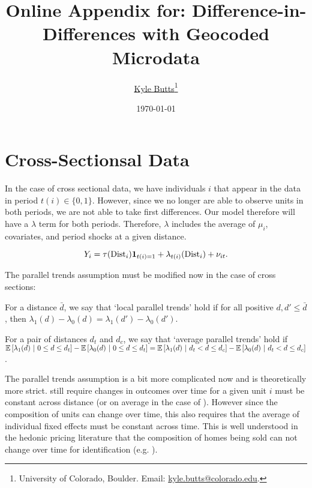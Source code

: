 \documentclass[10pt]{article}
\title{Online Appendix for: Difference-in-Differences with Geocoded Microdata}
\author{\href{https://kylebutts.com/}{Kyle Butts}\thanks{University of Colorado, Boulder. Email: \href{mailto:kyle.butts@colorado.edu}{kyle.butts@colorado.edu}.} %
}
\date{\today}
\newcommand{\dist}{\text{Dist}}
\begin{document}
\maketitle

\section{Cross-Sectionsal Data}

In the case of cross sectional data, we have individuals $i$ that appear in the data in period $t(i) \in \{0,1\}$. However, since we no longer are able to observe units in both periods, we are not able to take first differences. Our model therefore will have a $\lambda$ term for both periods. Therefore, $\lambda$ includes the average of $\mu_i$, covariates, and period shocks at a given distance.

\begin{equation}\label{eq:model_rc}
    Y_{i} = \tau(\dist_i) \one_{t(i) = 1} + \lambda_{t(i)}(\dist_i) + \nu_{it}.  
\end{equation}

The parallel trends assumption must be modified now in the case of cross sections:

\begin{assumption}\label{assum:parallel_rc}
    For a distance $\bar{d}$, we say that `local parallel trends' hold if for all positive $d, d' \leq \bar{d}$, then $\lambda_1(d) - \lambda_0(d) = \lambda_1(d') - \lambda_0(d')$.
\end{assumption}

\begin{assumption}\label{assum:parallel_weak_rc}
    For a pair of distances $d_t$ and $d_c$, we say that `average parallel trends' hold if $\mathbb{E}\left[\lambda_1(d) \ \vert \ 0 \leq d \leq d_t\right] - \mathbb{E}\left[\lambda_0(d) \ \vert \ 0 \leq d \leq d_t\right] = \mathbb{E}\left[\lambda_1(d) \ \vert \ d_t < d \leq d_c\right] - \mathbb{E}\left[\lambda_0(d) \ \vert \ d_t < d \leq d_c\right]$.
\end{assumption}

The parallel trends assumption is a bit more complicated now and is theoretically more strict.  still require changes in outcomes over time for a given unit $i$ must be constant across distance (or on average in the case of ). However since the composition of units can change over time, this also requires that the average of individual fixed effects must be constant across time. This is well understood in the hedonic pricing literature that the composition of homes being sold can not change over time for identification (e.g. \citet{Linden_Rockoff_2008}).
\end{document}
